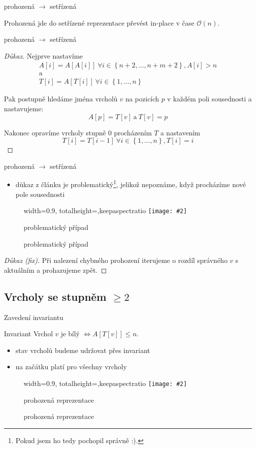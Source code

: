 \documentclass[czech]{beamer}
\makeatletter
\newcommand{\fitimage}[2][\@nil]{
	\begin{figure}
		\begin{adjustbox}{width=0.9\textwidth, totalheight=\textheight-2\baselineskip-2\baselineskip,keepaspectratio}
			\texttt{[image: \#2]}
		\end{adjustbox}
		\def\tmp{#1}%
	 \ifx\tmp\@nnil
			\else
			\caption{#1}
		\fi
	\end{figure}
}
\makeatother
\begin{document}
	\begin{frame}{prohozená $\rightarrow$ setřízená}
		\begin{lemma}
			Prohozená jde do setřízené reprezentace převést in-place v čase $\mathcal{O}\left(n\right)$.
		\end{lemma}
	\end{frame}

	\begin{frame}{prohozená $\rightarrow$ setřízená}
		\begin{proof}[Důkaz]
			\small
			Nejprve nastavíme 
			\begin{gather*}
				A[i] = A[A[i]]\ \forall i \in \left\{n + 2, \ldots, n + m + 2\right\}, A[i] > n \\
				\text{a} \\
				T[i] = A[T[i]]\ \forall i \in \left\{1, \ldots, n\right\}
			\end{gather*}

			Pak postupně hledáme jména vrcholů $v$ na pozicích $p$ v každém poli sousednosti a nastavujeme:
			$$A[p] = T[v]\ \text{a}\ T\left[v\right] = p$$

			Nakonec opravíme vrcholy stupně $0$ procházením $T$ a nastavením
			$$T[i] = T[i - 1]\ \forall i \in \left\{1, \ldots, n\right\}, T[i] = i$$
		\end{proof}
	\end{frame}

	\begin{frame}{prohozená $\rightarrow$ setřízená}
	\begin{itemize}
			\item důkaz z článku je problematický\footnote{Pokud jsem ho tedy pochopil správně :).}, jelikož nepoznáme, když procházíme nové pole sousednosti
		\end{itemize}
		\fitimage[problematický případ]{images/sorted-pointer-problem.png}
		\begin{proof}[Důkaz (fix)]
			Při nalezení chybného prohození iterujeme o rozdíl správného $v$ s aktuálním a prohazujeme zpět.
		\end{proof}
	\end{frame}

	\subsection{Vrcholy se stupněm $\ge 2$}

	\begin{frame}{Zavedení invariantu}
		\begin{block}{Invariant}
			Vrchol $v$ je bílý $\iff A[T[v]] \le n$.
		\end{block}
		\begin{itemize}
			\item stav vrcholů budeme udržovat přes invariant
			\item na začátku platí pro všechny vrcholy
		\end{itemize}
		\vfill
		\fitimage[prohozená reprezentace]{images/swapped.png}
	\end{frame}
\end{document}
